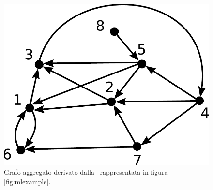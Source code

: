 \begin{figure}
    \centering
    \includegraphics[height=0.15865384615384615\textheight]{img/aggexample1.pdf}
    \caption{Grafo aggregato derivato dalla \muln\ rappresentata in figura \ref{fig:mlexample}.}
    \label{fig:graggexample}
\end{figure}



